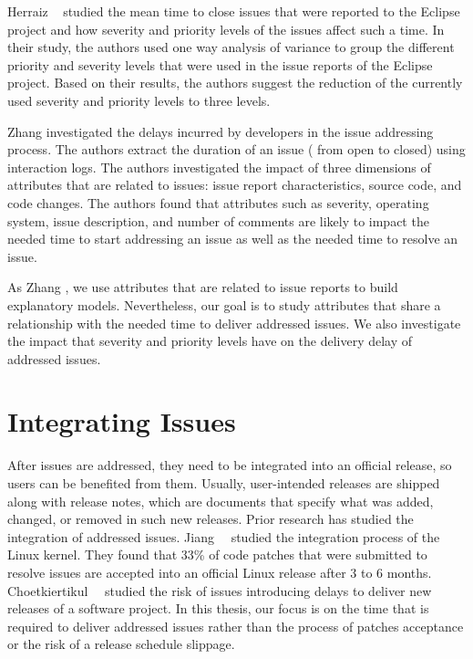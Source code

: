 Herraiz \etal~\cite{Herraiz2008} studied the mean time to close issues that were
reported to the Eclipse project and how severity and priority levels of the
issues affect such a time. In their study, the authors used one way analysis of
variance to group the different priority and severity levels that were used in
the issue reports of the Eclipse project. Based on their results, the authors
suggest the reduction of the currently used severity and priority levels to
three levels. 

Zhang \etal \cite{Zhang2012} investigated the delays incurred by developers in
the issue addressing process. The authors extract the duration of an issue (\ie
from open to closed) using interaction logs. The authors investigated the impact
of three dimensions of attributes that are related to issues: issue report
characteristics, source code, and code changes. The authors found that
attributes such as severity, operating system, issue description, and number of
comments are likely to impact the needed time to start addressing an issue as
well as the needed time to resolve an issue. 

As Zhang \etal \cite{Zhang2012}, we use attributes that are related to issue
reports to build explanatory models.  Nevertheless, our goal is to study
attributes that share a relationship with the needed time to deliver addressed
issues. We also investigate the impact that severity and priority levels have on
the delivery delay of addressed issues. 

\section{Integrating Issues} 

After issues are addressed, they need to be integrated into an official release,
so users can be benefited from them. Usually, user-intended releases are shipped
along with release notes, which are documents that specify what was added,
changed, or removed in such new
releases. Prior
research has studied the integration of addressed issues.
Jiang~\etal~\cite{Jiang2013} studied the integration process of the Linux
kernel. They found that 33\% of code patches that were submitted to resolve
issues are accepted into an official Linux release after 3 to 6 months.
Choetkiertikul~\etal~\cite{riskyissues2015a,riskyissues2015b} studied the risk
of issues introducing delays to deliver new releases of a software project.  In
this thesis, our focus is on the time that is required to deliver addressed
issues rather than the process of patches acceptance or the risk of a release
schedule slippage.

